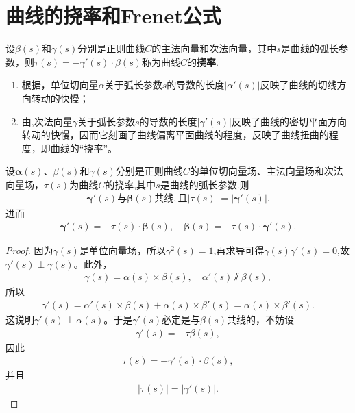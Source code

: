 \documentclass[../../main.tex]{subfiles}%
\begin{document}
\section{曲线的挠率和Frenet公式}

\begin{definition}
设$\beta(s)$和$\gamma(s)$分别是正则曲线$C$的主法向量和次法向量，其中$s$是曲线的弧长参数，则$\tau(s) = -\gamma'(s) \cdot \beta(s)$称为曲线$C$的\textbf{挠率}.
\end{definition}
\begin{remark}
\begin{enumerate}
\item 根据，单位切向量$\alpha$关于弧长参数$s$的导数的长度$|\alpha'(s)|$反映了曲线的切线方向转动的快慢；

\item 由,次法向量$\gamma$关于弧长参数$s$的导数的长度$|\gamma'(s)|$反映了曲线的密切平面方向转动的快慢，因而它刻画了曲线偏离平面曲线的程度，反映了曲线扭曲的程度，即曲线的“挠率”。
\end{enumerate}

\end{remark}

\begin{proposition}\label{proposition:挠率的基本性质}
设$\bm{\alpha}(s)$、$\beta(s)$和$\gamma(s)$分别是正则曲线$C$的单位切向量场、主法向量场和次法向量场，$\tau(s)$为曲线$C$的挠率,其中$s$是曲线的弧长参数.则
\begin{align*}
\boldsymbol{\gamma}'\left( s \right) \text{与}\boldsymbol{\beta }\left( s \right) \text{共线},\text{且}|\tau(s)| = |\bm{\gamma}'(s)|. 
\end{align*}
进而
\begin{align*}
\bm{\gamma}'(s)=-\tau(s)\cdot \bm{\beta}(s),\quad \bm{\beta}(s)=-\tau(s)\cdot \bm{\gamma}'(s).
\end{align*}
\end{proposition}
\begin{proof}
因为$\gamma(s)$是单位向量场，所以$\gamma^2(s)=1$,再求导可得$\gamma(s)\gamma'(s)=0$,故$\gamma'(s) \perp \gamma(s)$。此外，
\begin{align*}
\gamma(s) = \alpha(s) \times \beta(s), \quad \alpha'(s) \varparallel  \beta(s),
\end{align*}
所以
\begin{align*}
\gamma'(s) = \alpha'(s) \times \beta(s) + \alpha(s) \times \beta'(s) = \alpha(s) \times \beta'(s).
\end{align*}
这说明$\gamma'(s) \perp \alpha(s)$。于是$\gamma'(s)$必定是与$\beta(s)$共线的，不妨设
\begin{align*}
\gamma'(s) = -\tau \beta(s),
\end{align*}
因此
\begin{align*}
\tau(s) = -\gamma'(s) \cdot \beta(s), 
\end{align*}
并且
\begin{align*}
|\tau(s)| = |\gamma'(s)|. 
\end{align*}
\end{proof}
\end{document}

